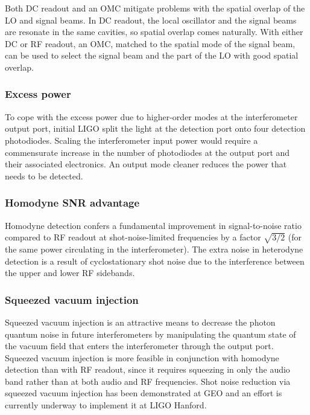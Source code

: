 Both DC readout and an OMC mitigate problems with the spatial overlap
of the LO and signal beams.  In DC readout, the local oscillator and
the signal beams are resonate in the same cavities, so spatial overlap
comes naturally.  With either DC or RF readout, an OMC, matched to the
spatial mode of the signal beam, can be used to select the signal beam
and the part of the LO with good spatial overlap.

\subsubsection*{Excess power}
To cope with the excess power due to higher-order modes at the
interferometer output port, initial LIGO split the light at the
detection port onto four detection photodiodes.  Scaling the
interferometer input power would require a commensurate increase in
the number of photodiodes at the output port and their associated
electronics.  An output mode cleaner reduces the power that needs to
be detected.

\subsubsection*{Homodyne SNR advantage} 
Homodyne detection confers a fundamental improvement in
signal-to-noise ratio compared to RF readout at shot-noise-limited
frequencies by a factor $\sqrt{3/2}$ (for the same power circulating
in the interferometer).  The extra noise in heterodyne detection is a
result of cyclostationary shot noise\cite{Niebauer1991Nonstationary}
due to the interference between the upper and lower RF sidebands.

\subsubsection*{Squeezed vacuum injection} 
Squeezed vacuum injection is an attractive means to decrease the
photon quantum noise in future interferometers by manipulating the
quantum state of the vacuum field that enters the interferometer
through the output port.  Squeezed vacuum injection is more feasible
in conjunction with homodyne detection than with RF readout, since it
requires squeezing in only the audio band rather than at both audio
and RF frequencies\cite{GeaBanacloche1987Squeezed,
  Chelkowski2007Coherent}.  Shot noise reduction via squeezed vacuum
injection has been demonstrated at GEO\cite{GeoSqueezingNature2011}
and an effort is currently underway to implement it at LIGO
Hanford\cite{H1SqueezerProposal}.

